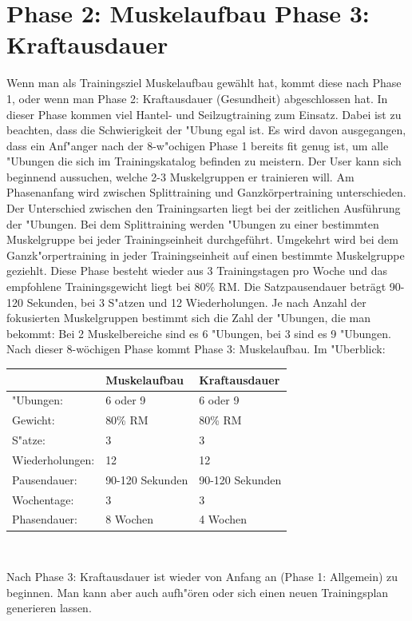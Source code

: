 \documentclass[a4paper,12pt]{article}
\begin{document}
	\section{Phase 2: Muskelaufbau \newline Phase 3: Kraftausdauer}	
	Wenn man als Trainingsziel \grqq{}Muskelaufbau\grqq{} gewählt hat, kommt diese nach Phase 1, oder wenn man Phase 2: Kraftausdauer (Gesundheit) abgeschlossen hat. In dieser Phase kommen viel Hantel- und Seilzugtraining zum Einsatz. Dabei ist zu beachten, dass die Schwierigkeit der "Ubung egal ist. Es wird davon ausgegangen, dass ein Anf"anger nach der 8-w"ochigen Phase 1 bereits fit genug ist, um alle "Ubungen die sich im Trainingskatalog befinden zu meistern. 
	\newline
	Der User kann sich beginnend aussuchen, welche 2-3 Muskelgruppen er trainieren will. Am Phasenanfang wird zwischen Splittraining und Ganzkörpertraining unterschieden. Der Unterschied zwischen den Trainingsarten liegt bei der zeitlichen Ausführung der "Ubungen. Bei dem Splittraining werden "Ubungen zu einer bestimmten Muskelgruppe bei jeder Trainingseinheit durchgeführt. Umgekehrt wird bei dem Ganzk"orpertraining in jeder Trainingseinheit auf einen bestimmte Muskelgruppe geziehlt. 
	\newline
	Diese Phase besteht wieder aus 3 Trainingstagen pro Woche und das empfohlene Trainingsgewicht liegt bei 80\% RM. Die Satzpausendauer beträgt 90-120 Sekunden, bei 3 S"atzen und 12 Wiederholungen. Je nach Anzahl der fokusierten Muskelgruppen bestimmt sich die Zahl der "Ubungen, die man bekommt: Bei 2 Muskelbereiche sind es 6 "Ubungen, bei 3 sind es 9 "Ubungen. Nach dieser 8-wöchigen Phase kommt Phase 3: Muskelaufbau.
	\newline
	Im "Uberblick:
	\newline
	\begin{center}
		\begin{tabular}{| l || l | l |}
			\hline
			& Muskelaufbau & Kraftausdauer \\ \hline
			"Ubungen: & 6 oder 9 & 6 oder 9 \\ \hline 
			Gewicht: & 80\% RM & 80\% RM \\ \hline
			S"atze: & 3 & 3\\ \hline
			Wiederholungen: & 12 & 12\\ \hline
			Pausendauer: & 90-120 Sekunden & 90-120 Sekunden \\ \hline
			Wochentage: & 3 & 3\\ \hline
			Phasendauer: & 8 Wochen & 4 Wochen \\ \hline
		\end{tabular} \\
	\end{center}
	Nach Phase 3: Kraftausdauer ist wieder von Anfang an (Phase 1: Allgemein) zu beginnen. Man kann aber auch aufh"ören oder sich einen neuen Trainingsplan generieren lassen.
	
\end{document}
